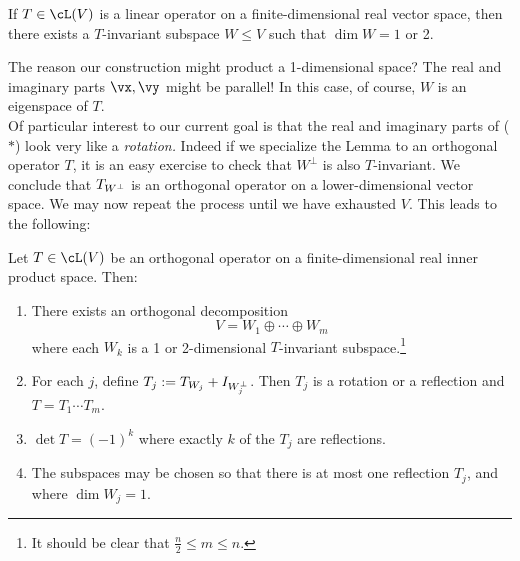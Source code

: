 \begin{lemm}{}{}
If $T\in\cL(V)$ is a linear operator on a finite-dimensional real vector space, then there exists a $T$-invariant subspace $W\le V$ such that $\dim W=1$ or 2.
\end{lemm}

The reason our construction might product a 1-dimensional space? The real and imaginary parts $\vx,\vy$ might be parallel! In this case, of course, $W$ is an eigenspace of $T$.\\

Of particular interest to our current goal is that the real and imaginary parts of ($\ast$) look very like a \emph{rotation.} Indeed if we specialize the Lemma to an orthogonal operator $T$, it is an easy exercise to check that $W^\perp$ is also $T$-invariant. We conclude that $T_{W^\perp}$ is an orthogonal operator on a lower-dimensional vector space. We may now repeat the process until we have exhausted $V$. This leads to the following:

\begin{thm}{}{}
Let $T\in\cL(V)$ be an orthogonal operator on a finite-dimensional real inner product space. Then:
\begin{enumerate}
  \item There exists an orthogonal decomposition
	\[V= W_1\oplus\cdots \oplus W_m\]
	where each $W_k$ is a 1 or 2-dimensional $T$-invariant subspace.\footnote{It should be clear that $\frac n2\le m\le n$.}
	\item For each $j$, define $T_j:=T_{W_j}+I_{W_j^\perp}$. Then $T_j$ is a rotation or a reflection and $T=T_1\cdots T_m$.
	\item $\det T=(-1)^k$ where exactly $k$ of the $T_j$ are reflections.
	\item The subspaces may be chosen so that there is at most one reflection $T_j$, and where $\dim W_j=1$.
\end{enumerate}
\end{thm}

